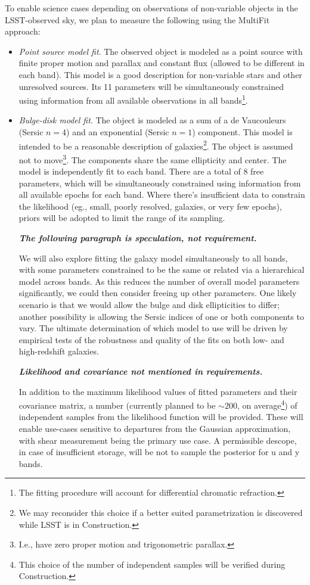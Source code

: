 \documentclass[12pt]{article}
\newcommand{\annotate}[1]{{\color{magenta}\large\textbf{\emph{#1}}}}
\newcommand{\req}[1]{\marginpar{\tiny #1}}
\newcommand{\dmreq}[1]{\req{DMS-REQ-#1}}
\begin{document}
To enable science cases depending on observations of non-variable objects in the LSST-observed sky, we plan to measure the following using the MultiFit approach:
%
\begin{itemize}
    \item {\em Point source model fit}. The observed object is modeled as a point source with finite proper motion and parallax and constant flux (allowed to be different in each band). \dmreq{0276} This model is a good description for non-variable stars and other unresolved sources. Its 11 parameters will be simultaneously constrained using information from all available observations in all bands\footnote{The fitting procedure will account for differential chromatic refraction.}.
    \item {\em Bulge-disk model fit}. \dmreq{0276} The object is modeled as a sum of a de Vaucouleurs (Sersic $n=4$) and an exponential (Sersic $n=1$) component. This model is intended to be a reasonable description of galaxies\footnote{We may reconsider this choice if a better suited parametrization is discovered while LSST is in Construction.}. The object is assumed not to move\footnote{I.e., have zero proper motion and trigonometric parallax.}. The components share the same ellipticity and center. The model is independently fit to each band. There are a total of 8 free parameters, which will be simultaneously constrained using information from all available epochs for each band. Where there's insufficient data to constrain the likelihood (eg., small, poorly resolved, galaxies, or very few epochs), priors will be adopted to limit the range of its sampling.

\annotate{The following paragraph is speculation, not requirement.}

We will also explore fitting the galaxy model simultaneously to all bands, with some parameters constrained to be the same or related via a hierarchical model across bands.  As this reduces the number of overall model parameters significantly, we could then consider freeing up other parameters. One likely scenario is that we would allow the bulge and disk ellipticities to differ; another possibility is allowing the Sersic indices of one or both components to vary.  The ultimate determination of which model to use will be driven by empirical tests of the robustness and quality of the fits on both low- and high-redshift galaxies.

\annotate{Likelihood and covariance not mentioned in requirements.}

In addition to the maximum likelihood values of fitted parameters and their covariance matrix, a number (currently planned to be $\sim 200$, on average\footnote{This choice of the number of independent samples will be verified during Construction.}) of independent samples from the likelihood function will be provided. These will enable use-cases sensitive to departures from the Gaussian approximation, with shear measurement being the primary use case. A permissible descope, in case of insufficient storage, will be not to sample the posterior for u and y bands.


\end{itemize}
\end{document}
